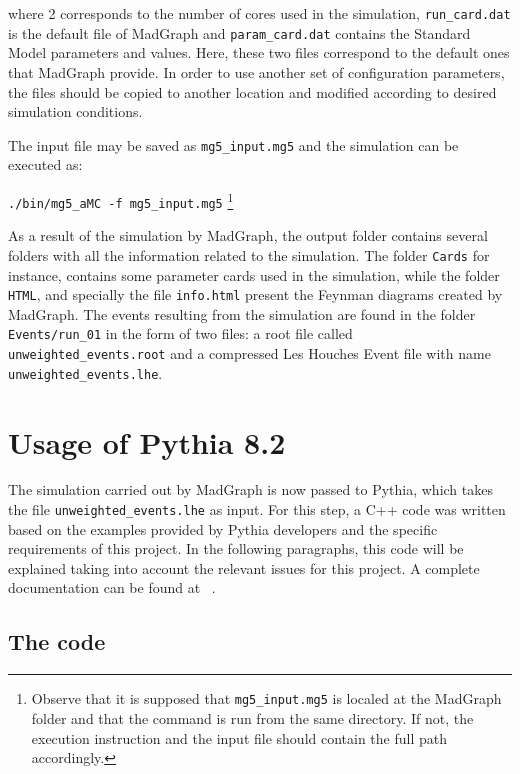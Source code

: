 \documentclass[12pt, oneside]{book}              %
\begin{document}
\noindent where 2 corresponds to the number of cores used in the simulation, 
\texttt{run\_card.dat} is the default file of MadGraph and \texttt{param\_card.dat} 
contains the Standard Model parameters and values. Here, these two files correspond
to the default ones that MadGraph provide. In order to use another set of 
configuration parameters, the files should be copied to another location
and modified according to desired simulation conditions.

The input file may be saved as \texttt{mg5\_input.mg5} and the simulation can be
executed as:

\noindent \texttt{./bin/mg5\_aMC -f mg5\_input.mg5} \footnote{Observe that it is
supposed that \texttt{mg5\_input.mg5} is localed at the MadGraph folder and that
the command is run from the same directory. If not, the execution instruction and
the input file should contain the full path accordingly.}

As a result of the simulation by MadGraph, the output folder contains several 
folders with all the information related to the simulation. The folder 
\texttt{Cards} for instance, contains some parameter cards used in the simulation,
while the folder \texttt{HTML}, and specially the file \texttt{info.html} present
the Feynman diagrams created by MadGraph. The events resulting from the simulation
are found in the folder \texttt{Events/run\_01} in the form of two files: a root 
file called \texttt{unweighted\_events.root} and a compressed Les Houches Event file
with name \texttt{unweighted\_events.lhe}.

\section{Usage of Pythia 8.2} \label{sec:Pythia8}

The simulation carried out by MadGraph is now passed to Pythia, which takes the
file \texttt{unweighted\_events.lhe} as input. For this step, a C++ code was written
based on the examples provided by Pythia developers and the specific requirements
of this project. In the following paragraphs, this code will be explained taking into
account the relevant issues for this project. A complete documentation can be found at
~\cite{Sjostrand:2006za}.

\subsection{The code}\label{sub:Pythia_code}
\end{document}
